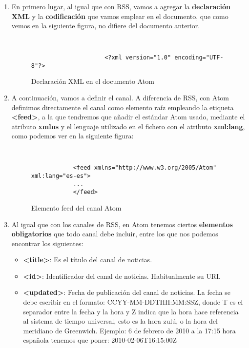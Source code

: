 \begin{enumerate}
    \item En primero lugar, al igual que con RSS, vamos a agregar la \textbf{declaración XML} y la \textbf{codificación} que vamos emplear en el documento, que como vemos en la siguiente figura, no difiere del documento anterior.

        \begin{figure}[H]
        \begin{tcolorbox}[sharp corners, colback=yellow!30, colframe=white!20]
            \scriptsize
            \begin{verbatim}


                     <?xml version="1.0" encoding="UTF-8"?>
            \end{verbatim}
        \end{tcolorbox}
        \caption{Declaración XML en el documento Atom}
    \end{figure}

    \item A continuación, vamos a definir el canal. A diferencia de RSS, con Atom definimos directamente el canal como elemento raíz empleando la etiqueta \textbf{<feed>}, a la que tendremos que añadir el estándar Atom usado, mediante el atributo \textbf{xmlns} y el lenguaje utilizado en el fichero con el atributo \textbf{xml:lang}, como podemos ver en la siguiente figura:

    \begin{figure}[h]
        \begin{tcolorbox}[sharp corners, colback=yellow!30, colframe=white!20]
            \scriptsize
            \begin{verbatim}


            <feed xmlns="http://www.w3.org/2005/Atom" xml:lang="es-es">
            ...
            </feed>
            \end{verbatim}
        \end{tcolorbox}
        \caption{Elemento feed del canal Atom}
    \end{figure}

    \item Al igual que con los canales de RSS, en Atom tenemos ciertos \textbf{elementos obligatorios} que todo canal debe incluir, entre los que nos podemos encontrar los siguientes:

    \begin{itemize}
        \item \textbf{<title>}: Es el título del canal de noticias.
        \item \textbf{<id>}: Identificador del canal de noticias. Habitualmente su URI.
        \item \textbf{<updated>}: Fecha de publicación del canal de noticias. La fecha se debe escribir en el formato: CCYY-MM-DDTHH:MM:SSZ, donde T es el separador entre la fecha y la hora y Z indica que la hora hace referencia al sistema de tiempo universal, esto es la hora zulú, o la hora del meridiano de Greenwich. Ejemplo: 6 de febrero de 2010 a la 17:15 hora española tenemos que poner: 2010-02-06T16:15:00Z
    \end{itemize}


\end{enumerate}
